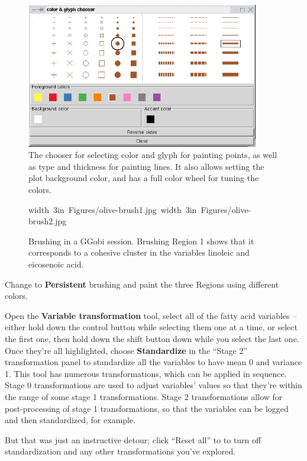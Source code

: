 \documentclass[11pt]{article}
\def\Widget#1{\textbf{#1}}
\begin{document}
\begin{figure}[htp]
\begin{center}
\includegraphics[width=4in]{Figures/olive-colorchoose.jpg}
\end{center}
\caption{The chooser for selecting color and glyph for painting points,
as well as type and thickness for painting lines. It also allows setting
the plot background color, and has a full color wheel for tuning the
colors.
}
\label{fig2}
\end{figure}

\begin{figure}[htp]
\hbox{\pdfimage width 3in {Figures/olive-brush1.jpg}
      \pdfimage width 3in {Figures/olive-brush2.jpg}
}
\caption{Brushing in a GGobi session. Brushing Region 1 shows that it
corresponds to a cohesive cluster in the variables linoleic and 
eicosenoic acid.
}
\label{fig3}
\end{figure}

Change to \Widget{Persistent} brushing and paint the three Regions
using different colors. 

Open the \Widget{Variable transformation} tool, select all of the fatty
acid variables -- either hold down the control button while selecting
them one at a time, or select the first one, then hold down the
shift button down while you select the last one.  Once they're all
highlighted, choose \Widget{Standardize} in the ``Stage 2'' transformation
panel to standardize all the variables to have mean 0 and variance 1.
This tool has numerous transformations, which can be applied in sequence.
Stage 0 transformations are used to adjust variables' values so that
they're within the range of some stage 1 transformations. Stage 2
transformations allow for post-processing of stage 1 transformations,
so that the variables can be logged and then standardized, for example.

But that was just an instructive detour; click ``Reset all'' to
to turn off standardization and any other transformations you've
explored.
\end{document}
